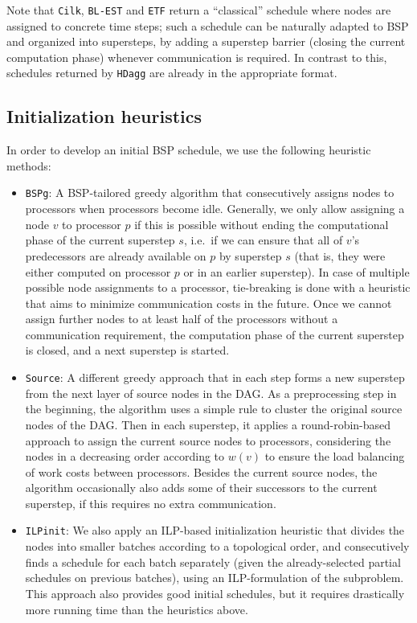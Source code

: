 \documentclass[sigconf,nonacm]{acmart}
\begin{document}
Note that \texttt{Cilk}, \texttt{BL-EST} and \texttt{ETF} return a ``classical'' schedule where nodes are assigned to concrete time steps; such a schedule can be naturally adapted to BSP and organized into supersteps, by adding a superstep barrier (closing the current computation phase) whenever communication is required. In contrast to this, schedules returned by \texttt{HDagg} are already in the appropriate format.

\subsection{Initialization heuristics}

In order to develop an initial BSP schedule, we use the following heuristic methods:
\begin{itemize}[topsep=4pt,itemsep=0pt,partopsep=2pt,parsep=7pt]
    \item \texttt{BSPg}: A BSP-tailored greedy algorithm that consecutively assigns nodes to processors when processors become idle. Generally, we only allow assigning a node $v$ to processor $p$ if this is possible without ending the computational phase of the current superstep $s$, i.e.\ if we can ensure that all of $v$'s predecessors are already available on $p$ by superstep $s$ (that is, they were either computed on processor $p$ or in an earlier superstep). In case of multiple possible node assignments to a processor, tie-breaking is done with a heuristic that aims to minimize communication costs in the future. Once we cannot assign further nodes to at least half of the processors without a communication requirement, the computation phase of the current superstep is closed, and a next superstep is started.
    \item \texttt{Source}: A different greedy approach that in each step forms a new superstep from the next layer of source nodes in the DAG. As a preprocessing step in the beginning, the algorithm uses a simple rule to cluster the original source nodes of the DAG. Then in each superstep, it applies a round-robin-based approach to assign the current source nodes to processors, considering the nodes in a decreasing order according to $w(v)$ to ensure the load balancing of work costs between processors. Besides the current source nodes, the algorithm occasionally also adds some of their successors to the current superstep, if this requires no extra communication.
    \item \texttt{ILPinit}: We also apply an ILP-based initialization heuristic that divides the nodes into smaller batches according to a topological order, and consecutively finds a schedule for each batch separately (given the already-selected partial schedules on previous batches), using an ILP-formulation of the subproblem. This approach also provides good initial schedules, but it requires drastically more running time than the heuristics above.
\end{itemize}
\end{document}

